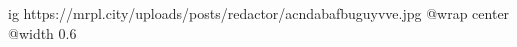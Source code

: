  
 
 
 
 

\ifcmt
  ig https://mrpl.city/uploads/posts/redactor/acndabafbuguyvve.jpg
  @wrap center
  @width 0.6
\fi
